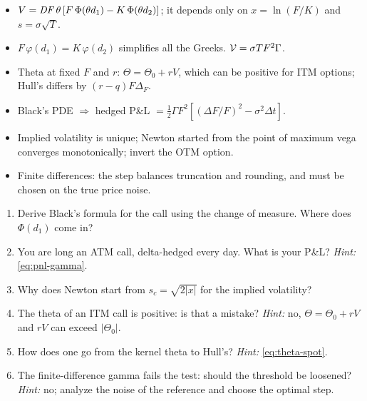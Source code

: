\begin{riassunto}
\begin{itemize}
\item $V=\mathit{DF}\,\theta\,[F\,\Phi(\theta d_1)-K\,\Phi(\theta d_2)]$; it depends only on $x=\ln(F/K)$ and $s=\sigma\sqrt T$.
\item $F\,\varphi(d_1)=K\,\varphi(d_2)$ simplifies all the Greeks. $\mathcal{V}=\sigma TF^2\Gamma$.
\item Theta at fixed $F$ and $r$: $\Theta=\Theta_0+rV$, which can be positive for ITM options; Hull's differs by
$(r-q)F\Delta_F$.
\item Black's PDE $\Rightarrow$ hedged P\&L $=\frac12\Gamma F^2[(\Delta F/F)^2-\sigma^2\Delta t]$.
\item Implied volatility is unique; Newton started from the point of maximum vega converges monotonically; invert the
OTM option.
\item Finite differences: the step balances truncation and rounding, and must be chosen on the true price noise.
\end{itemize}
\end{riassunto}

\begin{domande}
\begin{enumerate}
\item Derive Black's formula for the call using the change of measure. Where does $\Phi(d_1)$ come in?
\item You are long an ATM call, delta-hedged every day. What is your P\&L? \emph{Hint:} \eqref{eq:pnl-gamma}.
\item Why does Newton start from $s_c=\sqrt{2|x|}$ for the implied volatility?
\item The theta of an ITM call is positive: is that a mistake? \emph{Hint:} no, $\Theta=\Theta_0+rV$ and $rV$ can
exceed $|\Theta_0|$.
\item How does one go from the kernel theta to Hull's? \emph{Hint:} \eqref{eq:theta-spot}.
\item The finite-difference gamma fails the test: should the threshold be loosened? \emph{Hint:} no; analyze the
noise of the reference and choose the optimal step.
\end{enumerate}
\end{domande}
